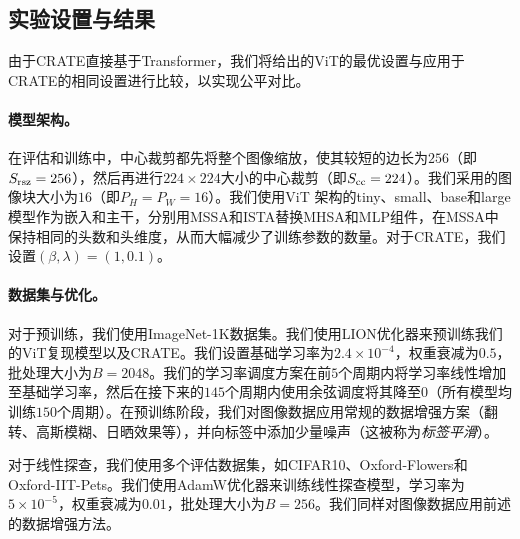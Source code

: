 \documentclass[../../book-main.tex]{subfiles}
\begin{document}
\subsection{实验设置与结果}\label{sub:image_classification_experiments}

由于CRATE直接基于Transformer，我们将\cite{dosovitskiy2020image,touvron2020training}给出的ViT的最优设置与应用于CRATE的相同设置进行比较，以实现公平对比。

\paragraph{模型架构。} 在评估和训练中，中心裁剪都先将整个图像缩放，使其较短的边长为\(256\)（即\(S_{\mathrm{rsz}} = 256\)），然后再进行\(224 \times 224\)大小的中心裁剪（即\(S_{\mathrm{cc}} = 224\)）。我们采用的图像块大小为\(16\)（即\(P_{H} = P_{W} = 16\)）。我们使用ViT \cite{dosovitskiy2020image}架构的tiny、small、base和large模型作为嵌入和主干，分别用MSSA和ISTA替换MHSA和MLP组件，在MSSA中保持相同的头数和头维度，从而大幅减少了训练参数的数量。对于CRATE，我们设置\((\beta, \lambda) = (1, 0.1)\)。

\paragraph{数据集与优化。} 对于预训练，我们使用ImageNet-1K数据集。我们使用LION优化器\citep{chen2024symbolic}来预训练我们的ViT复现模型以及CRATE。我们设置基础学习率为\(2.4 \times 10^{-4}\)，权重衰减为\(0.5\)，批处理大小为\(B = 2048\)。我们的学习率调度方案在前\(5\)个周期内将学习率线性增加至基础学习率，然后在接下来的\(145\)个周期内使用余弦调度将其降至\(0\)（所有模型均训练\(150\)个周期）。在预训练阶段，我们对图像数据应用常规的数据增强方案（翻转、高斯模糊、日晒效果等），并向标签中添加少量噪声（这被称为\textit{标签平滑}\citep{muller2019does}）。

对于线性探查，我们使用多个评估数据集，如CIFAR10、Oxford-Flowers和Oxford-IIT-Pets。我们使用AdamW优化器来训练线性探查模型，学习率为\(5 \times 10^{-5}\)，权重衰减为\(0.01\)，批处理大小为\(B = 256\)。我们同样对图像数据应用前述的数据增强方法。
\end{document}
